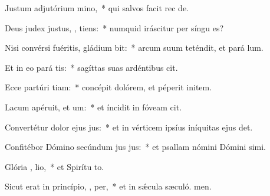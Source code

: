 \item Justum adjutórium   mino,~* qui salvos facit rec de.
\item Deus judex justus, ,  tiens:~* numquid iráscitur per síngu es?
\item Nisi convérsi fuéritis, gládium  bit:~* arcum suum teténdit, et pará lum.
\item Et in eo pará  tis:~* sagíttas suas ardéntibus cit.
\item Ecce partúri tiam:~* concépit dolórem, et péperit initem.
\item Lacum apéruit, et  um:~* et íncidit in fóveam  cit.
\item Convertétur dolor ejus   jus:~* et in vérticem ipsíus iníquitas ejus det.
\item Confitébor Dómino secúndum jus jus:~* et psallam nómini Dómini simi.
\item Glória ,  lio,~* et Spirítu to.
\item Sicut erat in princípio,  ,  per,~* et in sǽcula sæculó. men.
